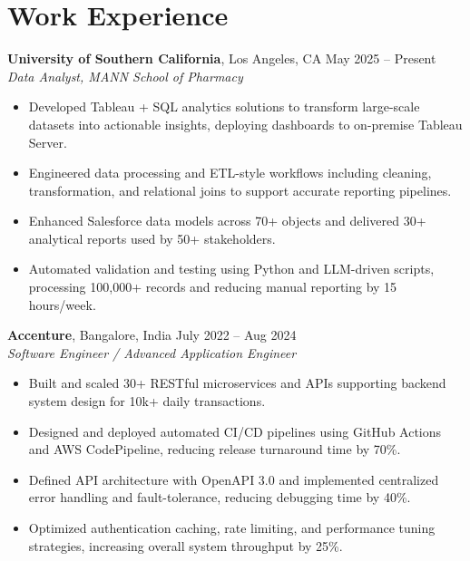 \documentclass[letterpaper,11pt]{article}
\begin{document}
\section*{Work Experience}
\textbf{University of Southern California}, Los Angeles, CA \hfill May 2025 -- Present \\
\textit{Data Analyst, MANN School of Pharmacy}
\begin{itemize}
    \item Developed Tableau + SQL analytics solutions to transform large-scale datasets into actionable insights, deploying dashboards to on-premise Tableau Server.
    \item Engineered data processing and ETL-style workflows including cleaning, transformation, and relational joins to support accurate reporting pipelines.
    \item Enhanced Salesforce data models across 70+ objects and delivered 30+ analytical reports used by 50+ stakeholders.
    \item Automated validation and testing using Python and LLM-driven scripts, processing 100,000+ records and reducing manual reporting by 15 hours/week.
\end{itemize}
\textbf{Accenture}, Bangalore, India \hfill July 2022 -- Aug 2024 \\
\textit{Software Engineer / Advanced Application Engineer}
\begin{itemize}
    \item Built and scaled 30+ RESTful microservices and APIs supporting backend system design for 10k+ daily transactions.
    \item Designed and deployed automated CI/CD pipelines using GitHub Actions and AWS CodePipeline, reducing release turnaround time by 70\%.
    \item Defined API architecture with OpenAPI 3.0 and implemented centralized error handling and fault-tolerance, reducing debugging time by 40\%.
    \item Optimized authentication caching, rate limiting, and performance tuning strategies, increasing overall system throughput by 25\%.
\end{itemize}

\end{document}
